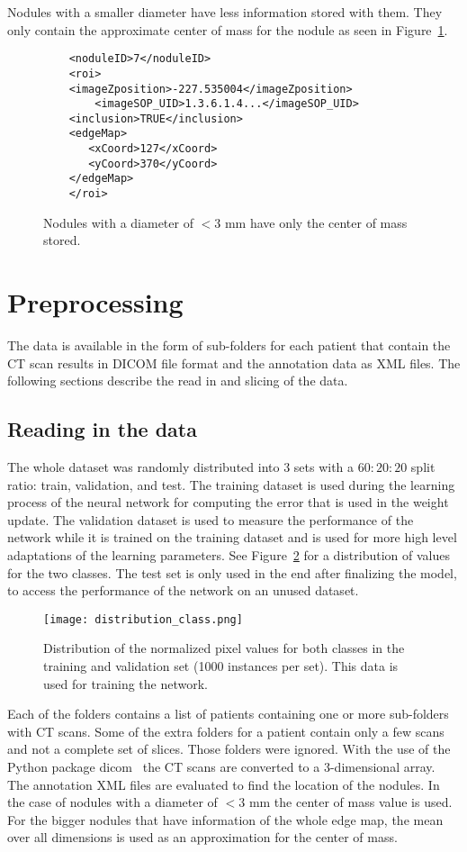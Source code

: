 \documentclass[../Thesis.tex]{subfiles}
\begin{document}
Nodules with a smaller diameter have less information stored with them. They only contain the approximate center of mass for the nodule as seen in Figure~\ref{fig:smallNod}.

\begin{figure}
\begin{lstlisting}
	<noduleID>7</noduleID>
	<roi>
	<imageZposition>-227.535004</imageZposition>
        <imageSOP_UID>1.3.6.1.4...</imageSOP_UID>
	<inclusion>TRUE</inclusion>
	<edgeMap>
	   <xCoord>127</xCoord>
	   <yCoord>370</yCoord>
	</edgeMap>
	</roi>
\end{lstlisting}
\caption{Nodules with a diameter of $<3$ mm have only the center of mass stored.}
\label{fig:smallNod}
\end{figure}

\section{Preprocessing}
The data is available in the form of sub-folders for each patient that contain the CT scan results in DICOM file format and the annotation data as XML files. The following sections describe the read in and slicing of the data.

\subsection{Reading in the data}
The whole dataset was randomly distributed into 3 sets with a $60:20:20$ split ratio: train, validation, and test. The training dataset is used during the learning process of the neural network for computing the error that is used in the weight update. The validation dataset is used to measure the performance of the network while it is trained on the training dataset and is used for more high level adaptations of the learning parameters. See Figure~\ref{fig:ttdist} for a distribution of values for the two classes. The test set is only used in the end after finalizing the model, to access the performance of the network on an unused dataset.
 
\begin{figure}
\texttt{[image: distribution\_class.png]}
\caption{Distribution of the normalized pixel values for both classes in the training and validation set (1000 instances per set). This data is used for training the network.}
\label{fig:ttdist}
\end{figure}

Each of the folders contains a list of patients containing one or more sub-folders with CT scans. Some of the extra folders for a patient contain only a few scans and not a complete set of slices. Those folders were ignored. With the use of the Python package dicom~\cite{mason2011t} the CT scans are converted to a 3-dimensional array. The annotation XML files are evaluated to find the location of the nodules. In the case of nodules with a diameter of $<3$ mm the center of mass value is used. For the bigger nodules that have information of the whole edge map, the mean over all dimensions is used as an approximation for the center of mass. 
\end{document}
